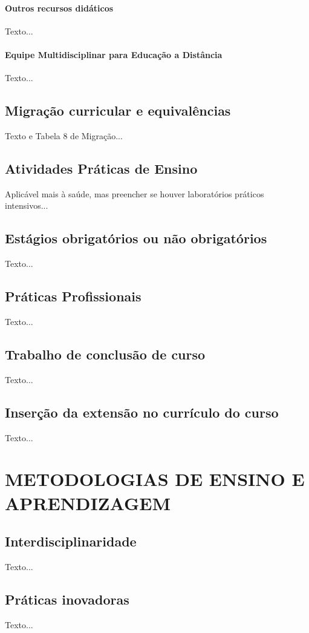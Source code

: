 \paragraph{Outros recursos didáticos} Texto...
\paragraph{Equipe Multidisciplinar para Educação a Distância} Texto...

\subsection{Migração curricular e equivalências}
Texto e Tabela 8 de Migração...

\subsection{Atividades Práticas de Ensino}
Aplicável mais à saúde, mas preencher se houver laboratórios práticos intensivos...

\subsection{Estágios obrigatórios ou não obrigatórios}
Texto...

\subsection{Práticas Profissionais}
Texto...

\subsection{Trabalho de conclusão de curso}
Texto...

\subsection{Inserção da extensão no currículo do curso}
Texto...

\section{METODOLOGIAS DE ENSINO E APRENDIZAGEM}
\subsection{Interdisciplinaridade}
Texto...
\subsection{Práticas inovadoras}
Texto...
